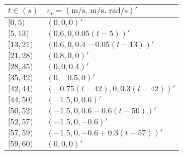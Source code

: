 \documentclass[a4paper,twoside]{article}
\begin{document}
\begin{center}
\begin{tabular}{|l|l|}
\hline
$t\in (s)$ & $v_r= (\textrm{m/s, m/s, rad/s})'$ \\ \hline
$[0,5)$ & $(0,0,0)'$ \\ 
$[5,13)$ & $(0.6,0,0.05(t-5))'$\\
$[13,21)$ & $(0.6,0,0.4-0.05(t-13))'$ \\
$[21,28)$ & $(0.8,0,0)'$ \\
$[28,35)$ & $(0,0,0.4)'$ \\
$[35,42)$ & $(0,-0.5,0)'$ \\
$[42,44)$ & $(-0.75(t-42),0,0.3(t-42))'$ \\
$[44,50)$ & $(-1.5,0,0.6)'$ \\
$[50,52)$ & $(-1.5,0,0.6-0.6(t-50))'$ \\ 
$[52,57)$ & $(-1.5,0,-0.6)'$ \\ 
$[57,59)$ & $(-1.5,0,-0.6+0.3(t-57))'$ \\ 
$[59,60)$ & $(0,0,0)'$ \\ \hline
\end{tabular}
\end{center}
\end{document}

